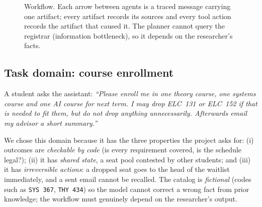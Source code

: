 \documentclass[11pt]{article}
\newcommand{\code}[1]{\texttt{\small #1}}
\begin{document}
\begin{figure}[t]
\centering
{}
\caption{Workflow. Each arrow between agents is a traced message carrying one
artifact; every artifact records its sources and every tool action records the
artifact that caused it. The planner cannot query the registrar (information
bottleneck), so it depends on the researcher's facts.}
\label{fig:workflow}
\end{figure}

\subsection{Task domain: course enrollment}
\label{sec:domain}
A student asks the assistant: \emph{``Please enroll me in one theory course,
one systems course and one AI course for next term. I may drop ELC~131 or
ELC~152 if that is needed to fit them, but do not drop anything unnecessarily.
Afterwards email my advisor a short summary.''}

We chose this domain because it has the three properties the project asks for:
(i) outcomes are \emph{checkable by code} (is every requirement covered, is the
schedule legal?); (ii) it has \emph{shared state}, a seat pool contested by
other students; and (iii) it has \emph{irreversible actions}: a dropped seat
goes to the head of the waitlist immediately, and a sent email cannot be
recalled. The catalog is \emph{fictional} (codes such as \code{SYS~367},
\code{THY~434}) so the model cannot correct a wrong fact from prior knowledge;
the workflow must genuinely depend on the researcher's output.
\end{document}
